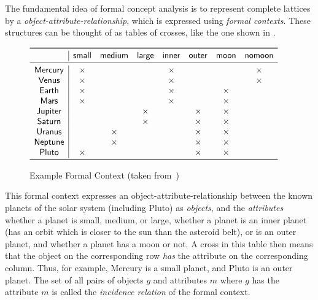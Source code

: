 The fundamental idea of formal concept analysis is to represent complete lattices by a
\emph{object-attribute-relationship}, which is expressed using \emph{formal contexts}.
These structures can be thought of as tables of crosses, like the one shown in
.

\begin{figure}[tp]
  \centering
  \begin{math}
    \begin{array}[c]{c|*{7}{c}}
      \toprule
      ~       & \mathsf{small} & \mathsf{medium} & \mathsf{large} & \mathsf{inner} &
      \mathsf{outer} & \mathsf{moon} & \mathsf{no moon} \\
      \midrule
      \mathsf{Mercury} & \times &   &   & \times &   &   & \times  \\
      \mathsf{Venus}   & \times &   &   & \times &   &   & \times  \\
      \mathsf{Earth}   & \times &   &   & \times &   & \times &    \\
      \mathsf{Mars}    & \times &   &   & \times &   & \times &    \\
      \mathsf{Jupiter} &   &   & \times &   & \times & \times &    \\
      \mathsf{Saturn}  &   &   & \times &   & \times & \times &    \\
      \mathsf{Uranus}  &   & \times &   &   & \times & \times &    \\
      \mathsf{Neptune} &   & \times &   &   & \times & \times &    \\
      \mathsf{Pluto}   & \times &   &   &   & \times & \times &    \\
      \bottomrule
    \end{array}
  \end{math}
  \caption{Example Formal Context (taken from~\cite{fca:Wille:1982})}
  \label{fig:example-formal-context}
\end{figure}

This formal context expresses an object-attribute-relationship between the known planets
of the solar system (including Pluto) as \emph{objects}, and the \emph{attributes} whether
a planet is \textsf{small}, \textsf{medium}, or \textsf{large}, whether a planet is an
\textsf{inner} planet (\ie has an orbit which is closer to the sun than the asteroid
belt), or is an \textsf{outer} planet, and whether a planet has a \textsf{moon} or not.  A
cross in this table then means that the object on the corresponding row \emph{has} the
attribute on the corresponding column.  Thus, for example, \textsf{Mercury} is a
\textsf{small} planet, and \textsf{Pluto} is an \textsf{outer} planet.  The set of all
pairs of objects $g$ and attributes $m$ where $g$ has the attribute $m$ is called the
\emph{incidence relation} of the formal context.

